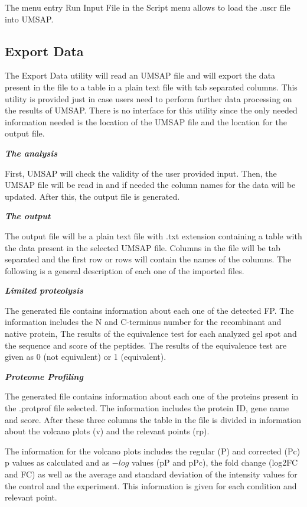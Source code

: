 The menu entry Run Input File in the Script menu allows to load the .uscr file into UMSAP.

\subsection{Export Data}
\label{subsec:utilExpData}

The Export Data utility will read an UMSAP file and will export the data present in the file to a table in a plain text file with tab separated columns. This utility is provided just in case users need to perform further data processing on the results of UMSAP. There is no interface for this utility since the only needed information needed is the location of the UMSAP file and the location for the output file.  

\textit{\textbf{The analysis}}

First, UMSAP will check the validity of the user provided input. Then, the UMSAP file will be read in and if needed the column names for the data will be updated. After this, the output file is generated.

\textit{\textbf{The output}}

The output file will be a plain text file with .txt extension containing a table with the data present in the selected UMSAP file. Columns in the file will be tab separated and the first row or rows will contain the names of the columns. The following is a general description of each one of the imported files.

\textit{\textbf{Limited proteolysis}}

The generated file contains information about each one of the detected FP. The information includes the N and C-terminus number for the recombinant and native protein, The results of the equivalence test for each analyzed gel spot and the sequence and score of the peptides. The results of the equivalence test are given as 0 (not equivalent) or 1 (equivalent).

\textit{\textbf{Proteome Profiling}}

The generated file contains information about each one of the proteins present in the .protprof file selected. The information includes the protein ID, gene name and score. After these three columns the table in the file is divided in information about the volcano plots (v) and the relevant points (rp).

The information for the volcano plots includes the regular (P) and corrected (Pc) p values as calculated and as $-log$ values (pP and pPc), the fold change (log2FC and FC) as well as the average and standard deviation of the intensity values for the control and the experiment. This information is given for each condition and relevant point.

